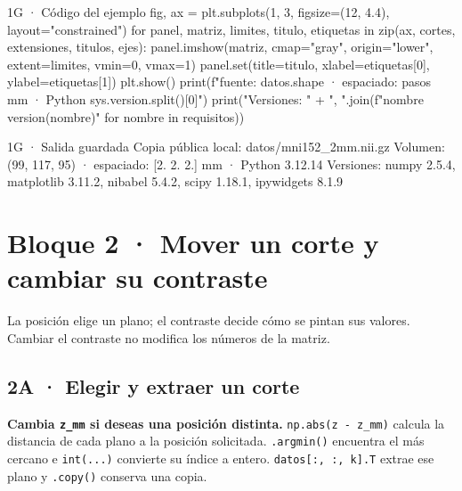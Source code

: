 \begin{CodigoVivo}{1G · Código del ejemplo}
fig, ax = plt.subplots(1, 3, figsize=(12, 4.4), layout="constrained")
for panel, matriz, limites, titulo, etiquetas in zip(ax, cortes, extensiones, titulos, ejes):
    panel.imshow(matriz, cmap="gray", origin="lower", extent=limites, vmin=0, vmax=1)
    panel.set(title=titulo, xlabel=etiquetas[0], ylabel=etiquetas[1])
plt.show()
print(f"{fuente}\nVolumen: {datos.shape} · espaciado: {pasos} mm · Python {sys.version.split()[0]}")
print("Versiones: " + ", ".join(f"{nombre} {version(nombre)}" for nombre in requisitos))
\end{CodigoVivo}



\begin{Salida}{1G · Salida guardada}
Copia pública local: datos/mni152_2mm.nii.gz
Volumen: (99, 117, 95) · espaciado: [2. 2. 2.] mm · Python 3.12.14
Versiones: numpy 2.5.4, matplotlib 3.11.2, nibabel 5.4.2, scipy 1.18.1, ipywidgets 8.1.9
\end{Salida}


\clearpage

\section*{Bloque 2 · Mover un corte y cambiar su contraste}


\label{vivo:bloque2}

La posición elige un plano; el contraste decide cómo se pintan sus valores. Cambiar el contraste no modifica los números de la matriz.


\subsection*{2A · Elegir y extraer un corte}

\label{vivo:2a}

\textbf{Cambia \texttt{\small z\_mm} si deseas una posición distinta.} \texttt{\small np.\allowbreak{}abs(\allowbreak{}z - z\_mm)\allowbreak{}} calcula la distancia de cada plano a la posición solicitada. \texttt{\small .\allowbreak{}argmin(\allowbreak{})\allowbreak{}} encuentra el más cercano e \texttt{\small int(\allowbreak{}.\allowbreak{}.\allowbreak{}.\allowbreak{})\allowbreak{}} convierte su índice a entero. \texttt{\small datos[:,\allowbreak{} :,\allowbreak{} k].\allowbreak{}T} extrae ese plano y \texttt{\small .\allowbreak{}copy(\allowbreak{})\allowbreak{}} conserva una copia.

